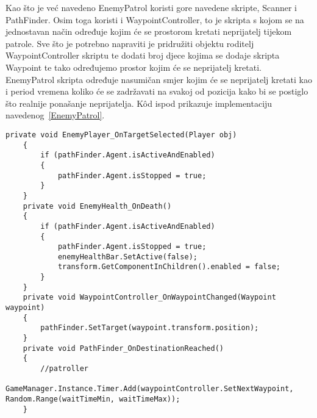 Kao što je već navedeno EnemyPatrol koristi gore navedene skripte, Scanner i PathFinder. Osim toga koristi i WaypointController, to je skripta s kojom se na jednostavan način određuje kojim će se prostorom kretati neprijatelj tijekom patrole. Sve što je potrebno napraviti je pridružiti objektu roditelj WaypointController skriptu te dodati broj djece kojima se dodaje skripta Waypoint te tako određujemo prostor kojim će se neprijatelj kretati. EnemyPatrol skripta određuje nasumičan smjer kojim će se neprijatelj kretati kao i period vremena koliko će se zadržavati na svakoj od pozicija kako bi se postiglo što realnije ponašanje neprijatelja. K\^od ispod prikazuje implementaciju navedenog~\ref{EnemyPatrol}.
\begin{lstlisting}[caption={Patroliranje neprijatelja}, label=EnemyPatrol]
private void EnemyPlayer_OnTargetSelected(Player obj)
    {
        if (pathFinder.Agent.isActiveAndEnabled)
        {
            pathFinder.Agent.isStopped = true;
        }
    }
    private void EnemyHealth_OnDeath()
    {
        if (pathFinder.Agent.isActiveAndEnabled)
        {
            pathFinder.Agent.isStopped = true;
            enemyHealthBar.SetActive(false);
            transform.GetComponentInChildren().enabled = false;
        }
    }
    private void WaypointController_OnWaypointChanged(Waypoint waypoint)
    {
        pathFinder.SetTarget(waypoint.transform.position);
    }
    private void PathFinder_OnDestinationReached()
    {
        //patroller
        GameManager.Instance.Timer.Add(waypointController.SetNextWaypoint, Random.Range(waitTimeMin, waitTimeMax));
    }
\end{lstlisting}

